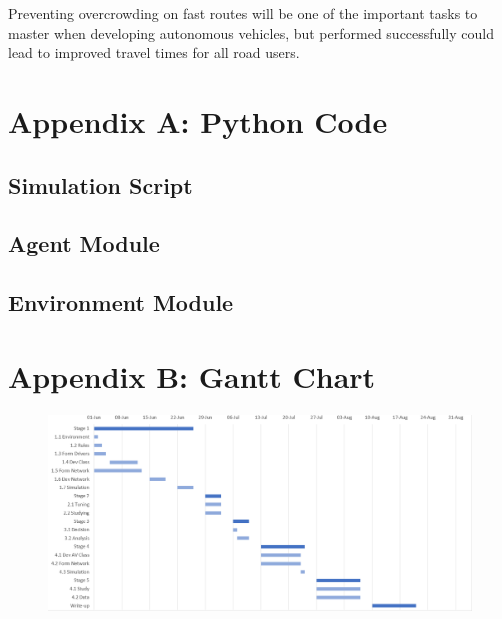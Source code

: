 \documentclass[12pt, a4paper, onecolumn]{article}
\begin{document}
Preventing overcrowding on fast routes will be one of the important tasks to master when developing autonomous vehicles, but performed successfully could lead to improved travel times for all road users.




\pagebreak



\pagebreak
\section*{Appendix A: Python Code}

\subsection*{Simulation Script}


\pagebreak
\subsection*{Agent Module}


\pagebreak
\subsection*{Environment Module}



\pagebreak
\section*{Appendix B: Gantt Chart}

\begin{figure}[h!]
	\centering
	\includegraphics[scale=.65, angle = 90]{gantt.png}
	\end{figure}
\end{document}
